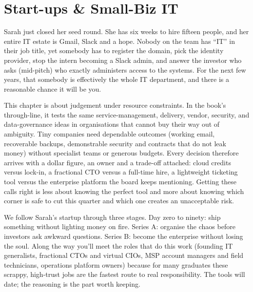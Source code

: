 
\chapter{Start-ups \& Small-Biz IT}

Sarah just closed her seed round. She has six weeks to hire fifteen people, and her entire IT estate is Gmail, Slack and a hope. Nobody on the team has ``IT'' in their job title, yet somebody has to register the domain, pick the identity provider, stop the intern becoming a Slack admin, and answer the investor who asks (mid-pitch) who exactly administers access to the systems. For the next few years, that somebody is effectively the whole IT department, and there is a reasonable chance it will be you.


This chapter is about judgement under resource constraints. In the book's through-line, it tests the same service-management, delivery, vendor, security, and data-governance ideas in organisations that cannot buy their way out of ambiguity. Tiny companies need dependable outcomes (working email, recoverable backups, demonstrable security and contracts that do not leak money) without specialist teams or generous budgets. Every decision therefore arrives with a dollar figure, an owner and a trade-off attached: cloud credits versus lock-in, a fractional CTO versus a full-time hire, a lightweight ticketing tool versus the enterprise platform the board keeps mentioning. Getting these calls right is less about knowing the perfect tool and more about knowing which corner is safe to cut this quarter and which one creates an unacceptable risk. \autocite{nist-csf-small-business,finops-framework}


We follow Sarah's startup through three stages. Day zero to ninety: ship something without lighting money on fire. Series A: organise the chaos before investors ask awkward questions. Series B: become the enterprise without losing the soul. Along the way you'll meet the roles that do this work (founding IT generalists, fractional CTOs and virtual CIOs, MSP account managers and field technicians, operations platform owners) because for many graduates these scrappy, high-trust jobs are the fastest route to real responsibility. The tools will date; the reasoning is the part worth keeping.

